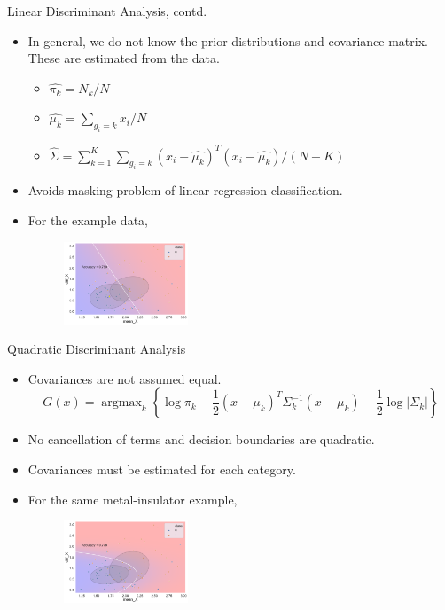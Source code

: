 \documentclass[aspectratio=169]{beamer}
\DeclareMathOperator*{\argmax}{argmax}
\begin{document}
\begin{frame}{Linear Discriminant Analysis, contd.}
    \begin{itemize}
        \item In general, we do not know the prior distributions and covariance matrix. These are estimated from the data.
        \begin{itemize}
            \item $\hat{\pi_k} = N_k/N$
            \item $\hat{\mu_k} = \sum_{g_i=k} x_i / N$
            \item $\hat{\Sigma} = \sum_{k=1}^K \sum_{g_i=k} (x_i - \hat{\mu_k})^T(x_i - \hat{\mu_k}) / (N - K)$
        \end{itemize}
        \item Avoids masking problem of linear regression classification.
        \item For the example data,
        \begin{figure}
            \centering
            \includegraphics[width=0.35\textwidth]{figures/lda_metal_insulator.png}
        \end{figure}
    \end{itemize}
\end{frame}


\begin{frame}{Quadratic Discriminant Analysis}
    \begin{itemize}
        \item Covariances are not assumed equal.
        \begin{equation*}
            G(x) = \argmax_k \left \{ \log{\pi_k} -\frac{1}{2}(x-\mu_k)^T\Sigma_k^{-1}(x-\mu_k) -\frac{1}{2} \log{|\Sigma_k|} \right \}
        \end{equation*}
        \item No cancellation of terms and decision boundaries are quadratic.
        \item Covariances must be estimated for each category.
        \item For the same metal-insulator example,
        \begin{figure}
            \centering
            \includegraphics[width=0.35\textwidth]{figures/qda_metal_insulator.png}
        \end{figure}
    \end{itemize}
\end{frame}
\end{document}
